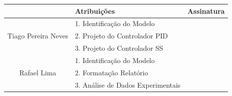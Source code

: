 \documentclass[a4paper,11pt]{article}
\begin{document}
\begin{table}[H]
    \centering
    \begin{tabular}{|c|p{6cm}|c|}
    \hline
         & Atribuições & Assinatura \\
    \hline
                        & 1. Identificação do Modelo & \\
    Tiago Pereira Neves & 2. Projeto do Controlador PID & \\
                        & 3. Projeto do Controlador SS & \\
    \hline

                & 1. Identificação do Modelo &\\
    Rafael Lima & 2. Formatação Relatório &\\
                & 3. Análise de Dados Experimentais& \\
     \hline
    \end{tabular}
\end{table}

\thispagestyle{empty}

\end{document}
